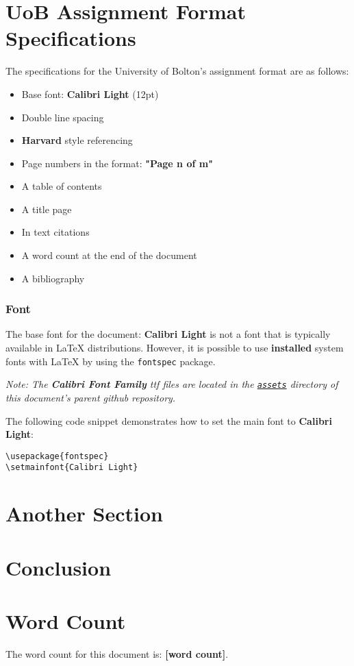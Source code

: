 \documentclass[12pt]{article}
\begin{document}
\section{UoB Assignment Format Specifications}
\label{sec:uob-assignment-format-specifications}

The specifications for the University of Bolton's assignment format are as follows:

\begin{itemize}
  \item Base font: \textbf{Calibri Light} (12pt)
  \item Double line spacing
  \item \textbf{Harvard} style referencing
  \item Page numbers in the format: \textbf{"Page n of m"}
  \item A table of contents
  \item A title page
  \item In text citations
  \item A word count at the end of the document
  \item A bibliography
\end{itemize}

\subsubsection{Font}
\label{sec:details}

The base font for the document: \textbf{Calibri Light} is not a font that is typically available in \LaTeX{} distributions. However, it is possible to use \textbf{installed} system fonts with \LaTeX{} by using the \texttt{fontspec} package.

\textit{ Note: The \textbf{Calibri Font Family} ttf files are located in the \texttt{\href{https://github.com/mike-shields-dev/University_of_Bolton_LaTeX_Assignment_Template/tree/main/assets}{assets}} directory of this document's parent github repository.} 


The following code snippet demonstrates how to set the main font to \textbf{Calibri Light}:
\begin{verbatim}
\usepackage{fontspec}
\setmainfont{Calibri Light}
\end{verbatim}

\section{Another Section}
\label{sec:another-section}

\newpage

\section{Conclusion}
\label{sec:conclusion}

\newpage

\section{Word Count}
\label{sec:word-count}

The word count for this document is: \textbf{[word count]}.



\newpage

\printbibliography
\end{document}
